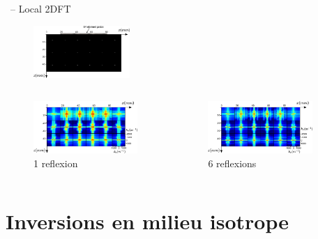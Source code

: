 \documentclass[10pt,xcolor=x11names,compress, notes=show]{beamer}%
\begin{document}
\begin{frame}{\insertsectionhead~-- Local 2DFT}
	\begin{figure}
		\includegraphics[height=2cm]{img/vp_scat.png}
	\end{figure}
	\begin{columns}
		\begin{figure}
			\includegraphics[height=2cm]{img/1400pt.png}
			\caption{1 reflexion}
		\end{figure}
		\begin{figure}
			\includegraphics[height=2cm]{img/4200pt.png}
			\caption{6 reflexions}
		\end{figure}
	\end{columns}

\end{frame}


\section{Inversions en milieu isotrope}
\end{document}
